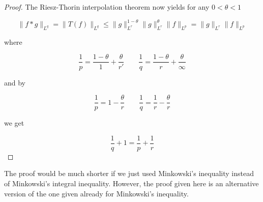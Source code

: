 \begin{proof}
	The Riesz-Thorin interpolation theorem now yields for any $0 < \theta < 1$

	\begin{equation}
		\|f \ast g\|_{L^q} = \|T(f)\|_{L^q} \leqslant \|g\|_{L^r}^{1 - \theta}\|g\|_{L^r}^{\theta} \|f\|_{L^p} = \|g\|_{L^r}\|f\|_{L^p}
	\end{equation}

	where 

	\begin{equation*}
		\frac{1}{p} = \frac{1 - \theta}{1} + \frac{\theta}{r'} \qquad \frac{1}{q} = \frac{1 - \theta}{r} + \frac{\theta}{\infty}
	\end{equation*}

	and by 

	\begin{equation*}
		\frac{1}{p} = 1 - \frac{\theta}{r} \qquad \frac{1}{q} = \frac{1}{r} - \frac{\theta}{r}
	\end{equation*}

	we get 

	\begin{equation*}
			\frac{1}{q} + 1 = \frac{1}{p} + \frac{1}{r}		
	\end{equation*}
\end{proof}

\begin{remark}
	The proof would be much shorter if we just used Minkowski's inequality \textup{\cite[21--22]{grafakos:fourier:2014}} instead of Minkowski's integral inequality. However, the proof given here is an alternative version of the one given already for Minkowski's inequality.
\end{remark}

